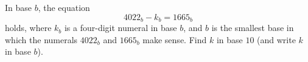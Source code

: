 In base $b$, the equation
\[
4022_b-k_b=1665_b
\]
holds, where $k_b$ is a four-digit numeral in base $b$, and $b$ is the smallest base in which the numerals $4022_b$ and $1665_b$ make sense. Find $k$ in base $10$ (and write $k$ in base $b$).
